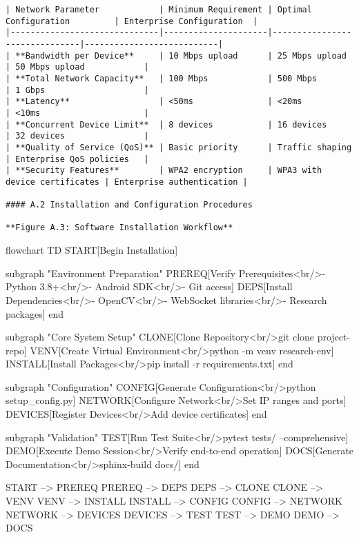 \documentclass[11pt,a4paper]{report}
\begin{document}
\begin{itemize}
\begin{verbatim}
| Network Parameter            | Minimum Requirement | Optimal Configuration         | Enterprise Configuration  |
|------------------------------|---------------------|-------------------------------|---------------------------|
| **Bandwidth per Device**     | 10 Mbps upload      | 25 Mbps upload                | 50 Mbps upload            |
| **Total Network Capacity**   | 100 Mbps            | 500 Mbps                      | 1 Gbps                    |
| **Latency**                  | <50ms               | <20ms                         | <10ms                     |
| **Concurrent Device Limit**  | 8 devices           | 16 devices                    | 32 devices                |
| **Quality of Service (QoS)** | Basic priority      | Traffic shaping               | Enterprise QoS policies   |
| **Security Features**        | WPA2 encryption     | WPA3 with device certificates | Enterprise authentication |

#### A.2 Installation and Configuration Procedures

**Figure A.3: Software Installation Workflow**

\end{verbatim}
\end{itemize}
flowchart TD
    START[Begin Installation]

    subgraph "Environment Preparation"
        PREREQ[Verify Prerequisites<br/>- Python 3.8+<br/>- Android SDK<br/>- Git access]
        DEPS[Install Dependencies<br/>- OpenCV<br/>- WebSocket libraries<br/>- Research packages]
    end

    subgraph "Core System Setup"
        CLONE[Clone Repository<br/>git clone project-repo]
        VENV[Create Virtual Environment<br/>python -m venv research-env]
        INSTALL[Install Packages<br/>pip install -r requirements.txt]
    end

    subgraph "Configuration"
        CONFIG[Generate Configuration<br/>python setup\_config.py]
        NETWORK[Configure Network<br/>Set IP ranges and ports]
        DEVICES[Register Devices<br/>Add device certificates]
    end

subgraph "Validation"
TEST[Run Test Suite<br/>pytest tests/ --comprehensive]
DEMO[Execute Demo Session<br/>Verify end-to-end operation]
DOCS[Generate Documentation<br/>sphinx-build docs/]
end

START --> PREREQ
PREREQ --> DEPS
DEPS --> CLONE
CLONE --> VENV
VENV --> INSTALL
INSTALL --> CONFIG
CONFIG --> NETWORK
NETWORK --> DEVICES
DEVICES --> TEST
TEST --> DEMO
DEMO --> DOCS
\end{document}
